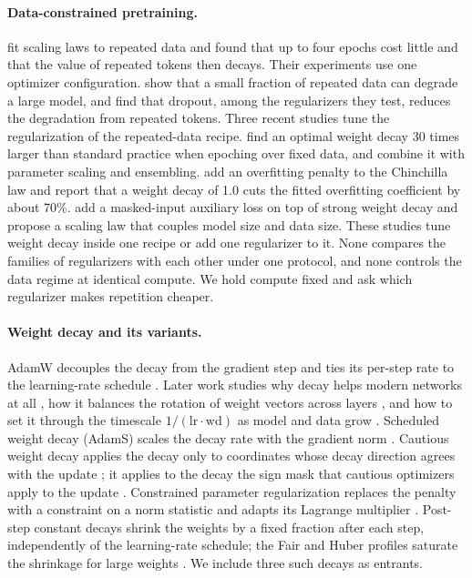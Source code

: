 \documentclass[twoside,11pt]{article}
\newcommand{\wdec}{\mathrm{wd}}
\begin{document}
\paragraph{Data-constrained pretraining.}
\citet{muennighoff2023scaling} fit scaling laws to repeated data and found that up to four epochs cost little and that the value of repeated tokens then decays. Their experiments use one optimizer configuration. \citet{hernandez2022scaling} show that a small fraction of repeated data can degrade a large model, and \citet{xue2023repeat} find that dropout, among the regularizers they test, reduces the degradation from repeated tokens. Three recent studies tune the regularization of the repeated-data recipe. \citet{kim2026infinite} find an optimal weight decay 30 times larger than standard practice when epoching over fixed data, and combine it with parameter scaling and ensembling. \citet{lovelace2026prescriptive} add an overfitting penalty to the Chinchilla law and report that a weight decay of 1.0 cuts the fitted overfitting coefficient by about 70\%. \citet{xu2026dataconstrained} add a masked-input auxiliary loss on top of strong weight decay and propose a scaling law that couples model size and data size. These studies tune weight decay inside one recipe or add one regularizer to it. None compares the families of regularizers with each other under one protocol, and none controls the data regime at identical compute. We hold compute fixed and ask which regularizer makes repetition cheaper.

\paragraph{Weight decay and its variants.}
AdamW decouples the decay from the gradient step and ties its per-step rate to the learning-rate schedule \citep{loshchilov2019decoupled}. Later work studies why decay helps modern networks at all \citep{dangelo2024why}, how it balances the rotation of weight vectors across layers \citep{kosson2024rotational}, and how to set it through the timescale $1/(\mathrm{lr}\cdot\wdec)$ as model and data grow \citep{wang2024adamw}. Scheduled weight decay (AdamS) scales the decay rate with the gradient norm \citep{xie2023overlooked}. Cautious weight decay applies the decay only to coordinates whose decay direction agrees with the update \citep{chen2026cautious}; it applies to the decay the sign mask that cautious optimizers apply to the update \citep{liang2024cautious}. Constrained parameter regularization replaces the penalty with a constraint on a norm statistic and adapts its Lagrange multiplier \citep{franke2024cpr}. Post-step constant decays shrink the weights by a fixed fraction after each step, independently of the learning-rate schedule; the Fair and Huber profiles saturate the shrinkage for large weights \citep{fair1974robust,huber1964robust}. We include three such decays as entrants.
\end{document}
